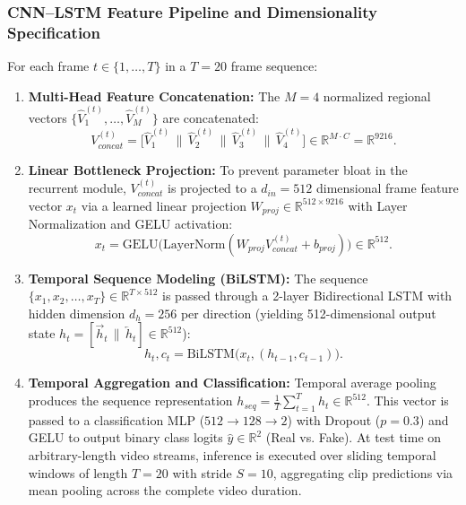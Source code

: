 \subsubsection{CNN–LSTM Feature Pipeline and Dimensionality Specification}
For each frame $t \in \{1, \dots, T\}$ in a $T=20$ frame sequence:
\begin{enumerate}
    \item \textbf{Multi-Head Feature Concatenation:} The $M=4$ normalized regional vectors $\{\hat{V}_1^{(t)}, \dots, \hat{V}_M^{(t)}\}$ are concatenated:
    \begin{equation}
        V_{concat}^{(t)} = \big[\hat{V}_1^{(t)} \,\|\, \hat{V}_2^{(t)} \,\|\, \hat{V}_3^{(t)} \,\|\, \hat{V}_4^{(t)}\big] \in \mathbb{R}^{M \cdot C} = \mathbb{R}^{9216}.
    \end{equation}
    \item \textbf{Linear Bottleneck Projection:} To prevent parameter bloat in the recurrent module, $V_{concat}^{(t)}$ is projected to a $d_{in}=512$ dimensional frame feature vector $x_t$ via a learned linear projection $W_{proj} \in \mathbb{R}^{512 \times 9216}$ with Layer Normalization and GELU activation:
    \begin{equation}
        x_t = \text{GELU}\Big(\text{LayerNorm}(W_{proj} V_{concat}^{(t)} + b_{proj})\Big) \in \mathbb{R}^{512}.
    \end{equation}
    \item \textbf{Temporal Sequence Modeling (BiLSTM):} The sequence $\{x_1, x_2, \dots, x_T\} \in \mathbb{R}^{T \times 512}$ is passed through a 2-layer Bidirectional LSTM with hidden dimension $d_h = 256$ per direction (yielding 512-dimensional output state $h_t = [\overrightarrow{h}_t \,\|\, \overleftarrow{h}_t] \in \mathbb{R}^{512}$):
    \begin{equation}
        h_t, c_t = \text{BiLSTM}\big(x_t, (h_{t-1}, c_{t-1})\big).
    \end{equation}
    \item \textbf{Temporal Aggregation and Classification:} Temporal average pooling produces the sequence representation $h_{seq} = \frac{1}{T}\sum_{t=1}^T h_t \in \mathbb{R}^{512}$. This vector is passed to a classification MLP ($512 \to 128 \to 2$) with Dropout ($p=0.3$) and GELU to output binary class logits $\hat{y} \in \mathbb{R}^2$ (Real vs. Fake). At test time on arbitrary-length video streams, inference is executed over sliding temporal windows of length $T=20$ with stride $S=10$, aggregating clip predictions via mean pooling across the complete video duration.
\end{enumerate}

